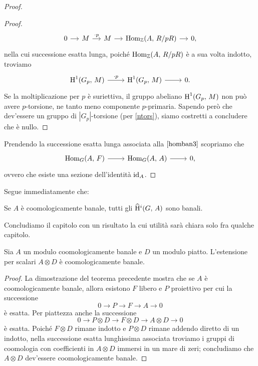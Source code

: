 \begin{proof}
\begin{proof}
		\begin{equation*}
		\begin{tikzcd}[column sep = small]
		0 \rar & M \rar["\cdot p"] & M \rar & \Hom_\Z(A, \, R/pR) \rar & 0,
		\end{tikzcd}
		\end{equation*}
		nella cui successione esatta lunga, poiché $ \operatorname{Hom}_{\mathbb{Z}}(A, \, R/pR) $ è a sua volta indotto, troviamo
		\[ \begin{tikzcd}
		\HH^1(G_p, \, M) \rar["\cdot p"] & \HH^1(G_p, \, M) \rar & 0.
		\end{tikzcd}  \]
		Se la moltiplicazione per $ p $ è suriettiva, il gruppo abeliano $ \operatorname{H}^1(G_p, \, M) $ non può avere $ p $-torsione, ne tanto meno componente $ p $-primaria. Sapendo però che dev'essere un gruppo di $ |G_p | $-torsione (per \ref{ntors}), siamo costretti a concludere che è nullo. 
	\end{proof}
	Prendendo la successione esatta lunga associata alla $ \eqref{homban3} $ scopriamo che
	\[\begin{tikzcd}
	\Hom_G(A, \, F) \rar & \Hom_G(A, \, A) \rar & 0,
	\end{tikzcd} \]
	ovvero che esiste una sezione dell'identità $ \operatorname{id}_A $.
\end{proof}

Segue immediatamente che:

\begin{corollary}
	Se $ A $ è coomologicamente banale, tutti gli $ \operatorname{\widehat{H}^\mathnormal{i}}(G, \, A) $ sono banali.
\end{corollary}

Concludiamo il capitolo con un risultato la cui utilità sarà chiara solo fra qualche capitolo.

\begin{corollary}\label{tensor magic}
	Sia $ A $ un modulo coomologicamente banale e $ D $ un modulo piatto. L'estensione per scalari $ A \otimes D $ è coomologicamente banale.
\end{corollary}
\begin{proof}
	La dimostrazione del teorema precedente mostra che se $ A $ è coomologicamente banale, allora esistono $ F $ libero e $ P $ proiettivo per cui la successione
	\[ 0 \to P \to F \to A \to 0 \]
	è esatta. Per piattezza anche la successione
	\[ 0 \to P \otimes D \to F\otimes D \to A\otimes D \to 0 \]
	è esatta. Poiché $ F \otimes D $ rimane indotto e $ P \otimes D $ rimane addendo diretto di un indotto, nella successione esatta lunghissima associata troviamo i gruppi di coomologia con coefficienti in $ A \otimes D $ immersi in un mare di zeri; concludiamo che $ A \otimes D $ dev'essere coomologicamente banale.
\end{proof}

